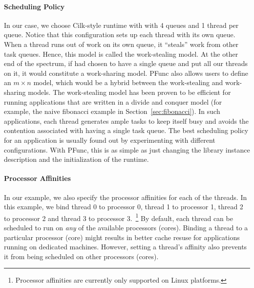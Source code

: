 \paragraph{Scheduling Policy} In our case, we choose Cilk-style runtime with
with 4 queues and 1 thread per queue. Notice that this configuration sets up
each thread with its own queue. When a thread runs out of work on its own
queue, it ``steals'' work from other task queues. Hence, this model is called
the work-stealing model. At the other end of the spectrum, if had chosen to
have a single queue and put all our threads on it, it would constitute a
work-sharing model. PFunc also allows users to define an $m\times{}n$ model,
which would be a hybrid between the work-stealing and work-sharing models.  The
work-stealing model has been proven to be efficient for running applications
that are written in a divide and conquer model (for example, the naive
fibonacci example in Section~\ref{sec:fibonacci}). In such applications, each
thread generates ample tasks to keep itself busy and avoids the contention
associated with having a single task queue. The best scheduling policy for an
application is usually found out by experimenting with different
configurations. With PFunc, this is as simple as just changing the library
instance description and the initialization of the runtime.

\paragraph{Processor Affinities} In our example, we also specify the processor
affinities for each of the threads. In this example, we bind thread 0 to
processor 0, thread 1 to processor 1, thread 2 to processor 2 and thread 3 to
processor 3.~\footnote{Processor affinities are currently only supported on
Linux platforms.} By default, each thread can be scheduled to run on
\textit{any} of the available processors (cores). Binding a thread to a
particular processor (core) might results in better cache resuse for
applications running on dedicated machines. However, setting a thread's
affinity also prevents it from being scheduled on other processors (cores). 

